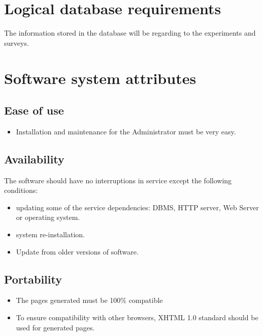 \documentclass[a4paper,12pt,oneside]{report}
\begin{document}
\section{Logical database requirements}
The information stored in the database will be regarding to the experiments and surveys. 
\section{Software system attributes}
\subsection{Ease of use}
\begin{itemize}
	\item Installation and maintenance for the Administrator must be very easy.
\end{itemize}


\subsection{Availability}
The software should have no interruptions in service except the following conditions: 
\begin{itemize}
	\item updating some of the service dependencies: DBMS, HTTP server, Web Server or operating system. 
	\item system re-installation. 
	\item Update from older versions of software.
\end{itemize}

\subsection{Portability}    
\begin{itemize}
	\item The pages generated must be 100$\%$ compatible
	\item To ensure compatibility with other browsers, XHTML 1.0 standard should be used for generated pages.
\end{itemize}
\end{document}
